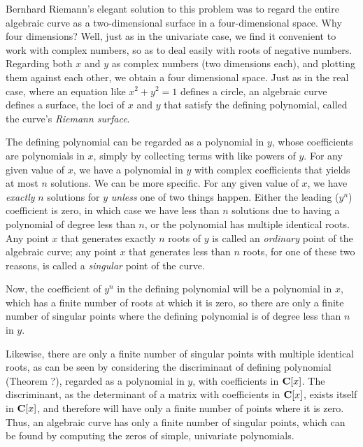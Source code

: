 Bernhard Riemann's elegant solution to this problem was to regard the
entire algebraic curve as a two-dimensional surface in a
four-dimensional space.  Why four dimensions?  Well, just as in the
univariate case, we find it convenient to work with complex numbers,
so as to deal easily with roots of negative numbers.  Regarding both
$x$ and $y$ as complex numbers (two dimensions each), and plotting
them against each other, we obtain a four dimensional space.  Just as
in the real case, where an equation like $x^2 + y^2 = 1$ defines a
circle, an algebraic curve defines a surface, the loci of $x$ and $y$
that satisfy the defining polynomial, called the curve's {\it Riemann
surface}.


The defining polynomial can be regarded as a polynomial in $y$, whose
coefficients are polynomials in $x$, simply by collecting terms with
like powers of $y$.  For any given value of $x$, we have a polynomial
in $y$ with complex coefficients that yields at most $n$ solutions.
We can be more specific.  For any given value of $x$, we have {\it
exactly} $n$ solutions for $y$ {\it unless} one of two things happen.
Either the leading ($y^n$) coefficient is zero, in which case we have
less than $n$ solutions due to having a polynomial of degree less than
$n$, or the polynomial has multiple identical roots.  Any point $x$
that generates exactly $n$ roots of $y$ is called an {\it ordinary}
point of the algebraic curve; any point $x$ that generates less than
$n$ roots, for one of these two reasons, is called a {\it singular}
point of the curve.

Now, the coefficient of $y^n$ in the defining polynomial will be a
polynomial in $x$, which has a finite number of roots at which it is
zero, so there are only a finite number of singular points where the
defining polynomial is of degree less than $n$ in $y$.

Likewise, there are only a finite number of singular points with
multiple identical roots, as can be seen by considering the
discriminant of defining polynomial (Theorem ?), regarded as a
polynomial in $y$, with coefficients in ${\bf C}[x]$.  The
discriminant, as the determinant of a matrix with coefficients in
${\bf C}[x]$, exists itself in ${\bf C}[x]$, and therefore will have
only a finite number of points where it is zero.  Thus, an algebraic
curve has only a finite number of singular points, which can be found
by computing the zeros of simple, univariate polynomials.

